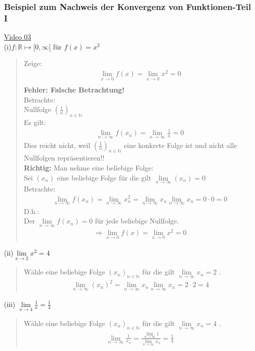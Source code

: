 \subsubsection{Beispiel zum Nachweis der Konvergenz von Funktionen-Teil I}
\href{https://youtu.be/sLrX5Et79Kg}{Video 03}\\
(i)\;\;$f:\mathbb{R}\longmapsto[0,\infty[$ für $ f(x)=x^2 $\\
\begin{quote}
	Zeige:\\
	\begin{align*}
	\lim\limits_ {x\to 0}f(x)=\lim\limits_ {x\to 0}x^2=0\\
	\end{align*}
	\textbf{Fehler: Falsche Betrachtung!}\\
	Betrachte:\\ Nullfolge $ (\frac{1}{n})_{n\in\mathbb{N}} $\\
	Es gilt:
	\begin{align*}
	\lim\limits_ {n\to \infty}f(x_n)=\lim\limits_ {n\to \infty}\frac{1}{n}=0
	\end{align*}
	Dies reicht nicht, weil $ (\frac{1}{n})_{n\in\mathbb{N}} $ eine konkrete Folge ist und nicht alle Nullfolgen repräsentieren!!\vspace*{4mm}\\
	\textbf{Richtig:}
	Man nehme eine beliebige Folge:\\
	Sei $ (x_n) $ eine beliebige Folge für die gilt $ \lim\limits_ {n\to\infty}(x_n)=0 $\\
	Betrachte:\\
	\begin{align*}
	\lim\limits_ {n\to\infty}f(x_n)=\lim\limits_ {n\to\infty}x_{n}^2=\lim\limits_ {n\to\infty}x_n\lim\limits_ {n\to\infty}x_n=0\cdot0=0
	\end{align*}
	D.h.:\\
	Der $ \lim\limits_ {n\to\infty}f(x_n) =0$ für jede beliebige Nullfolge.\\
	\begin{align*}
	\Rightarrow\lim\limits_ {x\to 0}f(x)=\lim\limits_ {x\to 0}x^2=0
	\end{align*}
\end{quote}
(ii)\;\;$ \lim\limits_ {x\to 2}x^2=4 $\\
\begin{quote}
Wähle eine beliebige Folge $(x_n)_{n\in\mathbb{N}}$ für die gilt $ \lim\limits_ {n\to\infty}x_n=2 $ .
\begin{align*}
\lim\limits_ {n\to\infty}(x_n)^2=\lim\limits_ {n\to\infty}x_n\lim\limits_ {n\to\infty}x_n=2\cdot2=4
\end{align*}
\end{quote}
(iii) \;\;$\lim\limits_ {x\to 4}\frac{1}{x}=\frac{1}{4}$\\
\begin{quote}
Wähle eine beliebige Folge $(x_n)_{n\in\mathbb{N}}$ für die gilt $ \lim\limits_ {n\to\infty}x_n=4 $ .\\
\begin{align*}
\lim\limits_ {n\to\infty}\frac{1}{x_n}=\frac{\lim\limits_ {n\to\infty}1}{\lim\limits_ {n\to\infty}x_n}=\frac{1}{4}
\end{align*}
\end{quote}

